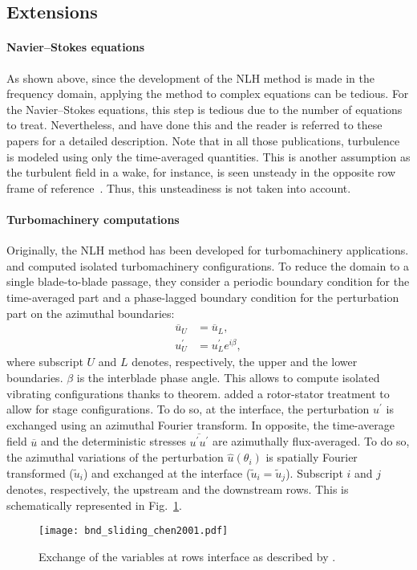\subsection{Extensions}

\paragraph{Navier--Stokes equations}
As shown above, since the development of the NLH
method is made in the frequency domain, applying the method to
complex equations can be tedious. For the Navier--Stokes equations,
this step is tedious due to the number of equations to treat. Nevertheless, 
\citet{He1998, Chen2001, He2002} and \citet{Vilmin2006} have
done this and the reader is referred to these papers
for a detailed description.
Note that in all those publications, turbulence is modeled
using only the time-averaged quantities.
This is another assumption as the turbulent field in a wake,
for instance, is seen unsteady in the opposite row frame
of reference~\cite{Lakshminarayana1980}. Thus, this
unsteadiness is not taken into account.

\paragraph{Turbomachinery computations}
Originally, the NLH method has been developed for 
turbomachinery applications. \citet{He1998} and
\citet{Ning1998} computed isolated turbomachinery
configurations. To reduce the domain to a single 
blade-to-blade passage, they consider a periodic
boundary condition for the time-averaged part and a
phase-lagged boundary condition for the perturbation part on the
azimuthal boundaries:
\begin{equation}
    \begin{split}
    	\overline{u}_U &= \overline{u}_L, \\
    	u^\prime_U &= u^\prime_L e^{i \beta},
    \end{split}
\end{equation}
where subscript $U$ and $L$ denotes, respectively, 
the upper and the lower boundaries. $\beta$ is the
interblade phase angle. This allows to compute
isolated vibrating configurations thanks to 
\citet{Lane1956} theorem.
\citet{Chen2001} added a rotor-stator treatment
to allow for stage configurations. 
To do so, at the interface, the perturbation 
$u^\prime$ is exchanged using
an azimuthal Fourier transform. In opposite,
the time-average field $\overline{u}$ 
and the deterministic stresses 
$\overline{u^\prime u^\prime}$
are azimuthally flux-averaged.
To do so, the azimuthal variations of 
the perturbation $\widehat{u} (\theta_i)$
is spatially Fourier transformed ($\widetilde{u}_i$)
and exchanged at the interface 
($\widetilde{u}_i = \widetilde{u}_j$). Subscript $i$ and $j$ denotes,
respectively, the upstream and the downstream rows.
This is schematically represented in 
Fig.~\ref{fig:bnd_sliding_chen2001}.
\begin{figure}[htbp]
  \centering
  \texttt{[image: bnd\_sliding\_chen2001.pdf]}
  \caption{Exchange of the variables at rows interface as described by \citet{Chen2001}.}
  \label{fig:bnd_sliding_chen2001}
\end{figure}

